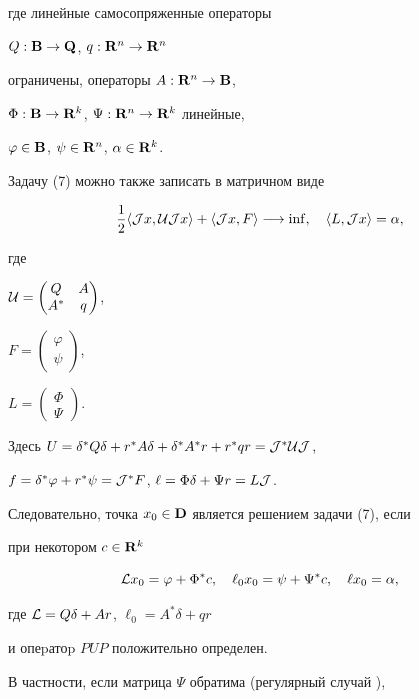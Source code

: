 где линейные самосопряженные операторы


$Q:\bold B\to\bold Q$, $q:\bold R^n\to\bold R^n$


ограничены, операторы $A:\bold R^n\to\bold B$,


$\Phi:\bold B\to\bold R^k$, $\Psi:\bold R^n\to\bold R^k$ линейные,


$\varphi\in\bold B$, $\psi\in\bold R^n$, $\alpha\in\bold R^k$.


Задачу (7) можно также записать в матричном виде


$$


\frac12\langle{\cal J}x,{\cal U}{\cal J}x\rangle+


\langle {\cal J}x, F\rangle\longrightarrow\inf,\quad


\langle L,{\cal J}x\rangle=\alpha,


$$


где


${\cal U}=\begin{pmatrix} Q&A\\A^*& q\end{pmatrix}$,


$F=\begin{pmatrix}\varphi\\ \psi\end{pmatrix}$,


$L=\begin{pmatrix}\Phi\\ \Psi\end{pmatrix}$.


Здесь $U=\delta^*Q\delta+r^*A\delta+\delta^*A^*r+r^*qr


={\cal J}^{*}{\cal U}{\cal J}$,


$f=\delta^*\varphi+r^*\psi={\cal J}^{*}F$, $\ell=\Phi\delta+\Psi r=L{\cal J}$.


Следовательно, точка $x_0\in\bold D$ является решением задачи (7), если


при некотором $c\in\bold R^k$


$$


{\cal L}x_0=\varphi+\Phi^*c,\quad


\ell_0x_0=\psi+\Psi^*c,\quad


\ell x_0=\alpha,


$$


где ${\cal L}=Q\delta+Ar$, $\ell_0=A^*\delta+qr$


и опеpатоp $PUP$ положительно определен.


В частности, если матрица $\Psi$ обратима (регулярный случай \cite{G}),


